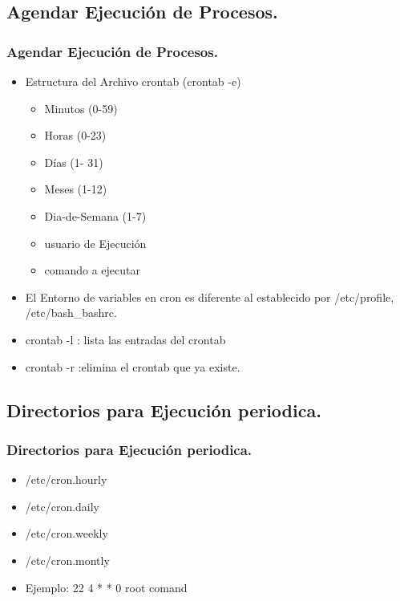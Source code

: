 \documentclass{beamer}
\begin{document}
\subsection{Agendar Ejecuci\'on de Procesos.}
\begin{frame}
\frametitle{Agendar Ejecuci\'on de Procesos.}
\begin{itemize}
\item Estructura del Archivo crontab (crontab -e)
	\begin{itemize}
	\item Minutos (0-59)
	\item Horas (0-23)
	\item D\'ias (1- 31)
	\item Meses (1-12)
	\item Dia-de-Semana (1-7)
	\item usuario de Ejecuci\'on
	\item comando a ejecutar
	\end{itemize}
\item El Entorno de variables en cron es diferente al establecido por /etc/profile, /etc/bash\_bashrc.
\item crontab -l : lista las entradas del crontab
\item crontab -r :elimina el crontab que ya existe.
\end{itemize}
\end{frame}

\subsection{Directorios para Ejecuci\'on periodica.}
\begin{frame}
\frametitle{Directorios para Ejecuci\'on periodica.}
\begin{itemize}
\item /etc/cron.hourly
\item /etc/cron.daily
\item /etc/cron.weekly
\item /etc/cron.montly
\item Ejemplo: 22 4 * * 0 root comand
\end{itemize}
\end{frame}
\end{document}
